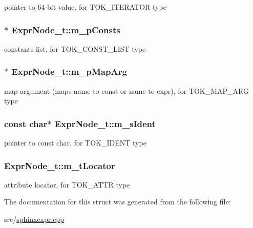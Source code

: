pointer to 64-\/bit value, for T\-O\-K\-\_\-\-I\-T\-E\-R\-A\-T\-O\-R type 

\hypertarget{structExprNode__t_a1350967836c47fd22b1e71cea87cf54d}{
\subsubsection[{m\-\_\-p\-Consts}]{$\ast$ Expr\-Node\-\_\-t\-::m\-\_\-p\-Consts}}\label{structExprNode__t_a1350967836c47fd22b1e71cea87cf54d}


constants list, for T\-O\-K\-\_\-\-C\-O\-N\-S\-T\-\_\-\-L\-I\-S\-T type 

\hypertarget{structExprNode__t_a4bf50267e002ad709b111b071abeeb47}{
\subsubsection[{m\-\_\-p\-Map\-Arg}]{$\ast$ Expr\-Node\-\_\-t\-::m\-\_\-p\-Map\-Arg}}\label{structExprNode__t_a4bf50267e002ad709b111b071abeeb47}


map argument (maps name to const or name to expr), for T\-O\-K\-\_\-\-M\-A\-P\-\_\-\-A\-R\-G type 

\hypertarget{structExprNode__t_a2e58049c1d93320737052c5fa3a071c9}{
\subsubsection[{m\-\_\-s\-Ident}]{\setlength{\rightskip}{0pt plus 5cm}const char$\ast$ Expr\-Node\-\_\-t\-::m\-\_\-s\-Ident}}\label{structExprNode__t_a2e58049c1d93320737052c5fa3a071c9}


pointer to const char, for T\-O\-K\-\_\-\-I\-D\-E\-N\-T type 

\hypertarget{structExprNode__t_a1293f5314ce85e4b3f338c97d793c842}{
\subsubsection[{m\-\_\-t\-Locator}]{ Expr\-Node\-\_\-t\-::m\-\_\-t\-Locator}}\label{structExprNode__t_a1293f5314ce85e4b3f338c97d793c842}


attribute locator, for T\-O\-K\-\_\-\-A\-T\-T\-R type 



The documentation for this struct was generated from the following file\-:\begin{DoxyCompactItemize}
\item 
src/\hyperlink{sphinxexpr_8cpp}{sphinxexpr.\-cpp}\end{DoxyCompactItemize}
